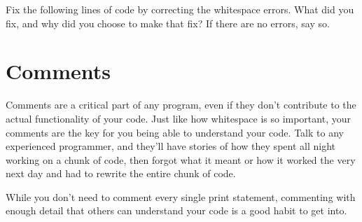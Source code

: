 \begin{Exercise}
Fix the following lines of code by correcting the whitespace errors. What did you fix, and why did you choose to make that fix? If there are no errors, say so.
\end{Exercise}
\section{Comments}
Comments are a critical part of any program, even if they don't contribute to the actual functionality of your code. Just like how whitespace is so important, your comments are the key for you being able to understand your code. Talk to any experienced programmer, and they'll have stories of how they spent all night working on a chunk of code, then forgot what it meant or how it worked the very next day and had to rewrite the entire chunk of code.\par
While you don't need to comment every single print statement, commenting with enough detail that others can understand your code is a good habit to get into.\par
